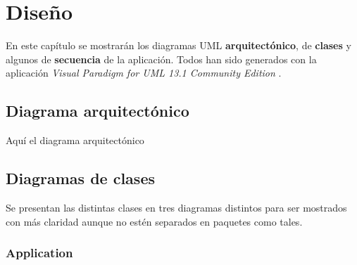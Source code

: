 \chapter{Diseño}

En este capítulo se mostrarán los diagramas UML \textbf{arquitectónico}, de \textbf{clases} y algunos de \textbf{secuencia} de la aplicación. Todos han sido generados con la aplicación \textit{Visual Paradigm for UML 13.1 Community Edition} \cite{vpp}.

\section{Diagrama arquitectónico}

Aquí el diagrama arquitectónico

\section{Diagramas de clases}

Se presentan las distintas clases en tres diagramas distintos para ser mostrados con más claridad aunque no estén separados en paquetes como tales.

\subsection{Application}

